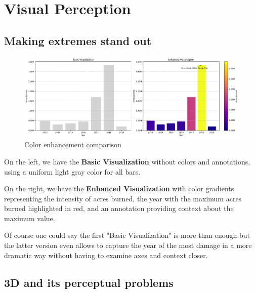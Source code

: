 \chapter{Visual Perception}

\section*{Making extremes stand out}

\begin{figure}[h]
    \includegraphics[width=\linewidth]{Images/figures/color_enhanced.png}
    \caption{Color enhancement comparison}
    \label{fig:colorenhanced}
\end{figure}

On the left, we have the \textbf{Basic Visualization} without colors and annotations, using a uniform light gray color for all bars.

On the right, we have the \textbf{Enhanced Visualization} with color gradients representing the intensity of acres burned, the year with the maximum acres burned highlighted in red, and an annotation providing context about the maximum value.

Of course one could say the first "Basic Visualization" is more than enough but the latter version even allows to capture the year of the most damage in a more dramatic way without having to examine axes and context closer.

\section*{3D and its perceptual problems}

